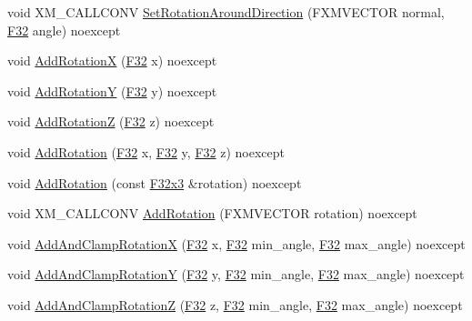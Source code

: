 \begin{DoxyCompactItemize}
void X\+M\+\_\+\+C\+A\+L\+L\+C\+O\+NV \hyperlink{classmage_1_1_transform_a8d829e3aeef9a2a529ceb405b7b36c64}{Set\+Rotation\+Around\+Direction} (F\+X\+M\+V\+E\+C\+T\+OR normal, \hyperlink{namespacemage_aa97e833b45f06d60a0a9c4fc22ae02c0}{F32} angle) noexcept
\item 
void \hyperlink{classmage_1_1_transform_a920bcbc350d3896bd1d8f9f6233cc008}{Add\+RotationX} (\hyperlink{namespacemage_aa97e833b45f06d60a0a9c4fc22ae02c0}{F32} x) noexcept
\item 
void \hyperlink{classmage_1_1_transform_ab9e20e922cd6e651a984480aa0aa6752}{Add\+RotationY} (\hyperlink{namespacemage_aa97e833b45f06d60a0a9c4fc22ae02c0}{F32} y) noexcept
\item 
void \hyperlink{classmage_1_1_transform_a973e713992328de9f5ad3b6ed4779f40}{Add\+RotationZ} (\hyperlink{namespacemage_aa97e833b45f06d60a0a9c4fc22ae02c0}{F32} z) noexcept
\item 
void \hyperlink{classmage_1_1_transform_a3204b0669d2735a4c05af1f6e10b46b1}{Add\+Rotation} (\hyperlink{namespacemage_aa97e833b45f06d60a0a9c4fc22ae02c0}{F32} x, \hyperlink{namespacemage_aa97e833b45f06d60a0a9c4fc22ae02c0}{F32} y, \hyperlink{namespacemage_aa97e833b45f06d60a0a9c4fc22ae02c0}{F32} z) noexcept
\item 
void \hyperlink{classmage_1_1_transform_a1b32d3782084953e3630fea231e3facc}{Add\+Rotation} (const \hyperlink{namespacemage_a73fbe0da4b8d5bc156bb8453e5b63a17}{F32x3} \&rotation) noexcept
\item 
void X\+M\+\_\+\+C\+A\+L\+L\+C\+O\+NV \hyperlink{classmage_1_1_transform_ae131948e8d2c34d1207e2188f75a3e9f}{Add\+Rotation} (F\+X\+M\+V\+E\+C\+T\+OR rotation) noexcept
\item 
void \hyperlink{classmage_1_1_transform_a401e2b3b3fb0675cb439329ee931d9f0}{Add\+And\+Clamp\+RotationX} (\hyperlink{namespacemage_aa97e833b45f06d60a0a9c4fc22ae02c0}{F32} x, \hyperlink{namespacemage_aa97e833b45f06d60a0a9c4fc22ae02c0}{F32} min\+\_\+angle, \hyperlink{namespacemage_aa97e833b45f06d60a0a9c4fc22ae02c0}{F32} max\+\_\+angle) noexcept
\item 
void \hyperlink{classmage_1_1_transform_aff1d8909255e85eb0100e90b2ac5068a}{Add\+And\+Clamp\+RotationY} (\hyperlink{namespacemage_aa97e833b45f06d60a0a9c4fc22ae02c0}{F32} y, \hyperlink{namespacemage_aa97e833b45f06d60a0a9c4fc22ae02c0}{F32} min\+\_\+angle, \hyperlink{namespacemage_aa97e833b45f06d60a0a9c4fc22ae02c0}{F32} max\+\_\+angle) noexcept
\item 
void \hyperlink{classmage_1_1_transform_a6b8797abb38b3bbe894193c89bb63a71}{Add\+And\+Clamp\+RotationZ} (\hyperlink{namespacemage_aa97e833b45f06d60a0a9c4fc22ae02c0}{F32} z, \hyperlink{namespacemage_aa97e833b45f06d60a0a9c4fc22ae02c0}{F32} min\+\_\+angle, \hyperlink{namespacemage_aa97e833b45f06d60a0a9c4fc22ae02c0}{F32} max\+\_\+angle) noexcept

\end{DoxyCompactItemize}

